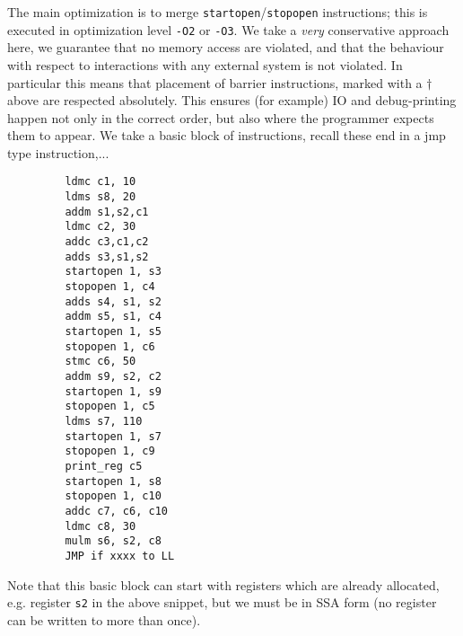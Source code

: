 The main optimization is to merge \verb+startopen+/\verb+stopopen+ instructions;
this is executed in optimization level \verb+-O2+ or \verb+-O3+.
We take a {\em very} conservative approach here, we guarantee that no memory
access are violated, and that the behaviour with respect to interactions with any
external system is not violated.
In particular this means that placement of barrier instructions, marked with a
$\dagger$ above are respected absolutely.
This ensures (for example) IO and debug-printing happen not only in the correct
order, but also where the programmer expects them to appear.
We take a basic block of instructions, recall these end in a jmp type instruction,...
\begin{verbatim}
         ldmc c1, 10
         ldms s8, 20
         addm s1,s2,c1
         ldmc c2, 30
         addc c3,c1,c2
         adds s3,s1,s2
         startopen 1, s3
         stopopen 1, c4
         adds s4, s1, s2
         addm s5, s1, c4
         startopen 1, s5
         stopopen 1, c6
         stmc c6, 50
         addm s9, s2, c2
         startopen 1, s9
         stopopen 1, c5
         ldms s7, 110
         startopen 1, s7
         stopopen 1, c9
         print_reg c5
         startopen 1, s8
         stopopen 1, c10
         addc c7, c6, c10
         ldmc c8, 30
         mulm s6, s2, c8
         JMP if xxxx to LL
\end{verbatim}
Note that this basic block can start with registers which are already allocated,
e.g. register \verb+s2+ in the above snippet, but we must be in SSA form (no register
can be written to more than once).



